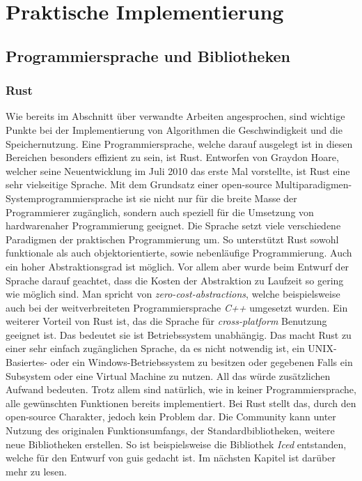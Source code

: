 \section{Praktische Implementierung}

\subsection{Programmiersprache und Bibliotheken}
\subsubsection{Rust}
    Wie bereits im Abschnitt über verwandte Arbeiten angesprochen, sind wichtige Punkte bei der Implementierung von Algorithmen die 
    Geschwindigkeit und die Speichernutzung. Eine Programmiersprache, welche darauf ausgelegt ist in diesen Bereichen besonders effizient zu sein, 
    ist Rust. \cite{rust} Entworfen von Graydon Hoare, welcher seine Neuentwicklung im Juli 2010 das erste Mal  vorstellte, ist Rust eine sehr vielseitige Sprache.
    Mit dem Grundsatz einer open-source Multiparadigmen-Systemprogrammiersprache ist sie nicht nur für die breite Masse der Programmierer zugänglich, sondern auch 
    speziell für die Umsetzung von hardwarenaher Programmierung geeignet. Die Sprache setzt viele verschiedene Paradigmen der praktischen Programmierung um. So 
    unterstützt Rust sowohl funktionale als auch objektorientierte, sowie nebenläufige Programmierung. Auch ein hoher Abstraktionsgrad ist möglich. Vor allem aber 
    wurde beim Entwurf der Sprache darauf geachtet, dass die Kosten der Abstraktion zu Laufzeit so gering wie möglich sind. Man spricht von \emph{zero-cost-abstractions}, 
    welche beispielsweise auch bei der weitverbreiteten Programmiersprache \emph{C++} umgesetzt wurden. \cite{rust-wiki}
    Ein weiterer Vorteil von Rust ist, das die Sprache für \emph{cross-platform} Benutzung geeignet ist. Das bedeutet sie ist Betriebssystem unabhängig. Das macht Rust zu einer 
    sehr einfach zugänglichen Sprache, da es nicht notwendig ist, ein UNIX-Basiertes- oder ein Windows-Betriebssystem zu besitzen oder gegebenen Falls ein Subsystem oder eine 
    Virtual Machine zu nutzen. All das würde zusätzlichen Aufwand bedeuten.
    Trotz allem sind natürlich, wie in keiner Programmiersprache, alle gewünschten Funktionen bereits implementiert. Bei Rust stellt das, durch den open-source Charakter,
    jedoch kein Problem dar. Die Community kann unter Nutzung des originalen Funktionsumfangs, der Standardbibliotheken, weitere neue Bibliotheken erstellen. 
    So ist beispielsweise die Bibliothek \emph{Iced} entstanden, welche für den Entwurf von \ac{gui}s gedacht ist. Im nächsten Kapitel ist darüber mehr zu lesen.
